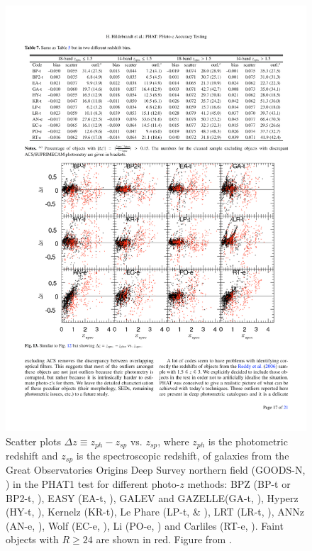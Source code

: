 \begin{figure}
\centering
\includegraphics[width=140mm]{./plots/phat_dzvsz.pdf}
\caption{Scatter plots $\Delta z \equiv z_{ph} - z_{sp}$ vs. $z_{sp}$, where $z_{ph}$ is the photometric redshift and $z_{sp}$ is the spectroscopic redshift, of galaxies from the Great Observatories Origins Deep Survey northern field (GOODS-N, \citet{Giavalisco2004}) in the PHAT1 test \citep{Hildebrandt2010} for different photo-$z$ methods: BPZ (BP-t or BP2-t, \citet{Benitez2000}), EASY (EA-t, \citet{Brammer2008}), GALEV and GAZELLE(GA-t, \citet{Kotulla2008}), Hyperz (HY-t, \citet{Bolzonella2000}), Kernelz (KR-t), Le Phare (LP-t, \citet{Arnouts1999} \& \citet{Ilbert2006}), LRT (LR-t, \citet{Assef2008}), ANNz (AN-e, \citet{Collister2004}), Wolf (EC-e, \citet{Wolf2014}), Li (PO-e, \citet{Li2008}) and Carliles (RT-e, \citet{Carliles2010}). Faint objects with $R\ge24$ are shown in red. Figure from \citet{Hildebrandt2010}.}
\label{fig:phat_photoz}
\end{figure}

